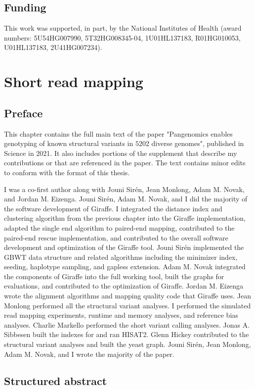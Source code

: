 \documentclass[11pt]{ucscthesis}
\begin{document}
\section{Funding}
This work was supported, in part, by the National Institutes of Health (award numbers: 5U54HG007990, 5T32HG008345-04, 1U01HL137183, R01HG010053, U01HL137183, 2U41HG007234).

\chapter{Short read mapping}
\section{Preface}
This chapter contains the full main text of the paper "Pangenomics enables genotyping of known structural variants in $5202$ diverse genomes"\cite{sr_giraffe_2021}, published in Science in 2021.
It also includes portions of the supplement that describe my contributions or that are referenced in the paper.
The text contains minor edits to conform with the format of this thesis.

I was a co-first author along with Jouni Sirén, Jean Monlong, Adam M. Novak, and Jordan M. Eizenga.
Jouni Sirén, Adam M. Novak, and I did the majority of the software development of Giraffe.
I integrated the distance index and clustering algorithm from the previous chapter into the Giraffe implementation, adapted the single end algorithm to paired-end mapping, contributed to the paired-end rescue implementation, and contributed to the overall software development and optimization of the Giraffe tool.
Jouni Sirén implemented the GBWT data structure and related algorithms including the minimizer index, seeding, haplotype sampling, and gapless extension.
Adam M. Novak integrated the components of Giraffe into the full working tool, built the graphs for evaluations, and contributed to the optimization of Giraffe.
Jordan M. Eizenga wrote the alignment algorithms and mapping quality code that Giraffe uses.
Jean Monlong performed all the structural variant analyses.
I performed the simulated read mapping experiments, runtime and memory analyses, and reference bias analyses. 
Charlie Markello performed the short variant calling analyses.
Jonas A. Sibbesen built the indexes for and ran HISAT2.
Glenn Hickey contributed to the structural variant analyses and built the yeast graph.
Jouni Sirén, Jean Monlong, Adam M. Novak, and I wrote the majority of the paper. 


\section{Structured abstract}
\end{document}
